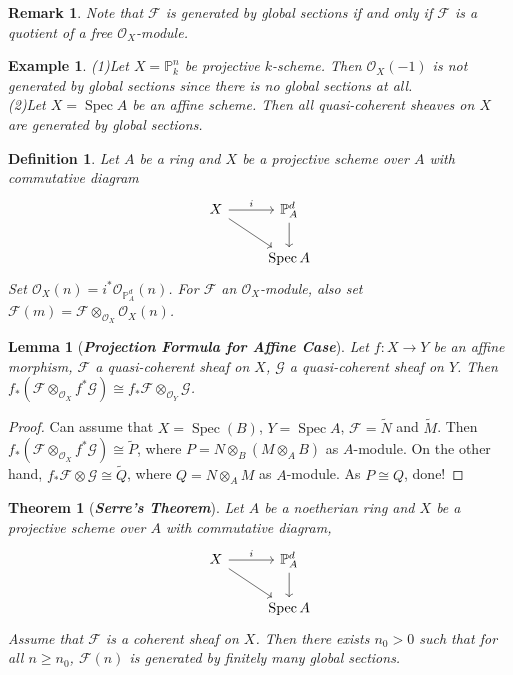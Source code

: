\documentclass{ctexart}
\newtheorem{definition}{Definition}[section]
\newtheorem{remark}{Remark}[section]
\newtheorem{theorem}{Theorem}[section]
\newtheorem{lemma}{Lemma}[section]
\newtheorem{example}{Example}[section]
\newcommand{\spec}{\operatorname{Spec}}
\begin{document}
\begin{remark}
    Note that $\mathcal{F}$ is generated by global sections if and only if $\mathcal{F}$ is a quotient of a free $\mathcal{O}_{X}$-module.
\end{remark}
\begin{example}
    (1)Let $X = \mathbb{P}_{k}^{n}$ be projective $k$-scheme.
    Then $\mathcal{O}_{X}(-1)$ is not generated by global sections since there is no global sections at all. \\
    (2)Let $X = \spec A$ be an affine scheme.
    Then all quasi-coherent sheaves on $X$ are generated by global sections.
\end{example}
\begin{definition}
    Let $A$ be a ring and $X$ be a projective scheme over $A$ with commutative diagram
    \begin{equation}
        \begin{tikzcd}
            X \arrow[r, "i"] \arrow[dr] &
            \mathbb{P}_{A}^{d} \arrow[d] \\
            & \spec A
        \end{tikzcd}
    \end{equation}
    Set $\mathcal{O}_{X}(n) = i^{\ast}\mathcal{O}_{\mathbb{P}_{A}^{d}}(n)$.
    For $\mathcal{F}$ an $\mathcal{O}_{X}$-module, also set $\mathcal{F}(m) = \mathcal{F} \otimes_{\mathcal{O}_{X}} \mathcal{O}_{X}(n)$.
\end{definition}
\begin{lemma}[\textbf{\emph{Projection Formula for Affine Case}}]
    Let $f: X \longrightarrow Y$ be an affine morphism, $\mathcal{F}$ a quasi-coherent sheaf on $X$, $\mathcal{G}$ a quasi-coherent sheaf on $Y$.
    Then $f_{\ast}(\mathcal{F} \otimes_{\mathcal{O}_{X}} f^{\ast}\mathcal{G}) \cong f_{\ast}\mathcal{F} \otimes_{\mathcal{O}_{Y}} \mathcal{G}$.
    \label{Lemma 1.3}
\end{lemma}
\begin{proof}
    Can assume that $X = \spec(B)$, $Y = \spec A$, $\mathcal{F} = \widetilde{N}$ and $\widetilde{M}$.
    Then $f_{\ast}(\mathcal{F} \otimes_{\mathcal{O}_{X}} f^{\ast}\mathcal{G}) \cong \widetilde{P}$,
    where $P = N \otimes_{B} (M \otimes_{A} B)$ as $A$-module.
    On the other hand, $f_{\ast}\mathcal{F} \otimes \mathcal{G} \cong \widetilde{Q}$,
    where $Q = N \otimes_{A} M$ as $A$-module.
    As $P \cong Q$, done!
\end{proof}
\begin{theorem}[\textbf{\emph{Serre's Theorem}}]
    Let $A$ be a noetherian ring and $X$ be a projective scheme over $A$ with commutative diagram, 
    \begin{equation}
        \begin{tikzcd}
            X \arrow[r, "i"] \arrow[dr] &
            \mathbb{P}_{A}^{d} \arrow[d] \\
            & \spec A
        \end{tikzcd}
    \end{equation}
    Assume that $\mathcal{F}$ is a coherent sheaf on $X$.
    Then there exists $n_{0} > 0$ such that for all $n \ge n_{0}$, $\mathcal{F}(n)$ is generated by finitely many global sections.
    \label{Theorem 1.2}
\end{theorem}
\end{document}
